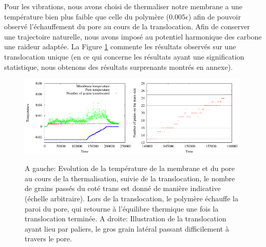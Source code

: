 \documentclass[a4paper,11pt]{article}
\begin{document}
Pour les vibrations, nous avons choisi de thermaliser notre membrane a une température bien plus faible que celle du polymère ($0.005\epsilon$) afin de pouvoir observé l'échauffement du pore au cours de la translocation. Afin de conserver une trajectoire naturelle, nous avons imposé au potentiel harmonique des carbone une raideur adaptée. La Figure \ref{temperature} commente les résultats observés sur une translocation unique (en ce qui concerne les résultats ayant une signification statistique, nous obtenons des résultats surprenants montrés en annexe).
\begin{figure}[H]
\begin{center}
\includegraphics[width=0.49\textwidth]{tempmurmobil.pdf}\includegraphics[width=0.49\textwidth]{murmobil.pdf}

\caption{A gauche: Evolution de la température de la membrane et du pore au cours de la thermalisation, suivie de la translocation, le nombre de grains passés du coté trans est donné de manière indicative (échelle arbitraire). Lors de la translocation, le polymère échauffe la paroi du pore, qui retourne à l'équilibre thermique une fois la translocation terminée. A droite: Illustration de la translocation ayant lieu par paliers, le gros grain latéral passant difficilement à travers le pore.}
\label{temperature}
\end{center}
\end{figure}





\end{document}

